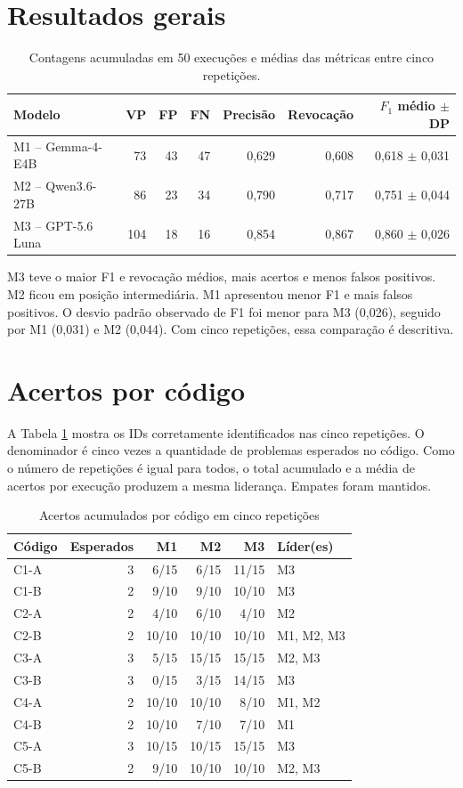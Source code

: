 \documentclass[12pt,a4paper]{article}
\begin{document}
\section{Resultados gerais}
\begin{table}[ht]
\centering
\caption{Contagens acumuladas em 50 execuções e médias das métricas entre cinco repetições.}
\begin{tabular}{lrrrrrr}
\toprule
Modelo & VP & FP & FN & Precisão & Revocação & $F_1$ médio $\pm$ DP\\
\midrule
M1 -- Gemma-4-E4B & 73 & 43 & 47 & 0,629 & 0,608 & 0,618 $\pm$ 0,031\\
M2 -- Qwen3.6-27B & 86 & 23 & 34 & 0,790 & 0,717 & 0,751 $\pm$ 0,044\\
M3 -- GPT-5.6 Luna & 104 & 18 & 16 & 0,854 & 0,867 & 0,860 $\pm$ 0,026\\
\bottomrule
\end{tabular}
\end{table}

M3 teve o maior F1 e revocação médios, mais acertos e menos falsos positivos. M2 ficou em posição intermediária. M1 apresentou menor F1 e mais falsos positivos. O desvio padrão observado de F1 foi menor para M3 (0,026), seguido por M1 (0,031) e M2 (0,044). Com cinco repetições, essa comparação é descritiva.

\section{Acertos por código}
A Tabela \ref{tab:acertos} mostra os IDs corretamente identificados nas cinco repetições. O denominador é cinco vezes a quantidade de problemas esperados no código. Como o número de repetições é igual para todos, o total acumulado e a média de acertos por execução produzem a mesma liderança. Empates foram mantidos.

\begin{table}[ht]
\centering
\caption{Acertos acumulados por código em cinco repetições}
\label{tab:acertos}
\scriptsize
\begin{tabular}{lrrrrl}
\toprule
Código & Esperados & M1 & M2 & M3 & Líder(es)\\
\midrule
C1-A & 3 & 6/15 & 6/15 & 11/15 & M3\\
C1-B & 2 & 9/10 & 9/10 & 10/10 & M3\\
C2-A & 2 & 4/10 & 6/10 & 4/10 & M2\\
C2-B & 2 & 10/10 & 10/10 & 10/10 & M1, M2, M3\\
C3-A & 3 & 5/15 & 15/15 & 15/15 & M2, M3\\
C3-B & 3 & 0/15 & 3/15 & 14/15 & M3\\
C4-A & 2 & 10/10 & 10/10 & 8/10 & M1, M2\\
C4-B & 2 & 10/10 & 7/10 & 7/10 & M1\\
C5-A & 3 & 10/15 & 10/15 & 15/15 & M3\\
C5-B & 2 & 9/10 & 10/10 & 10/10 & M2, M3\\
\bottomrule
\end{tabular}
\end{table}
\end{document}
